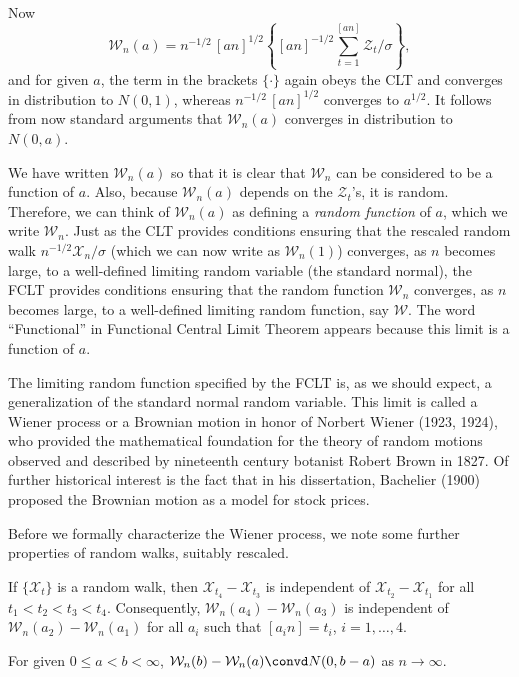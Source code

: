 Now
\[
\mathcal{W}_n(a) = n^{-1/2}\,[an]^{1/2}\left\{[an]^{-1/2}\sum_{t=1}^{[an]} \mathcal{Z}_t / \sigma\right\},
\]
and for given $a$, the term in the brackets $\{\cdot\}$ again obeys the CLT and converges in distribution to $N(0,1)$, whereas $n^{-1/2}\,[an]^{1/2}$ converges to $a^{1/2}$. It follows from now standard arguments that $\mathcal{W}_n(a)$ converges in distribution to $N(0,a)$.

We have written $\mathcal{W}_n(a)$ so that it is clear that $\mathcal{W}_n$ can be considered to be a function of $a$. Also, because $\mathcal{W}_n(a)$ depends on the $\mathcal{Z}_t$'s, it is random. Therefore, we can think of $\mathcal{W}_n(a)$ as defining a \emph{random function} of $a$, which we write $\mathcal{W}_n$. Just as the CLT provides conditions ensuring that the rescaled random walk $n^{-1/2}\mathcal{X}_n/\sigma$ (which we can now write as $\mathcal{W}_n(1)$) converges, as $n$ becomes large, to a well-defined limiting random variable (the standard normal), the FCLT provides conditions ensuring that the random function $\mathcal{W}_n$ converges, as $n$ becomes large, to a well-defined limiting random function, say $\mathcal{W}$. The word ``Functional'' in Functional Central Limit Theorem appears because this limit is a function of $a$.

The limiting random function specified by the FCLT is, as we should expect, a generalization of the standard normal random variable. This limit is called a Wiener process or a Brownian motion in honor of Norbert Wiener (1923, 1924), who provided the mathematical foundation for the theory of random motions observed and described by nineteenth century botanist Robert Brown in 1827. Of further historical interest is the fact that in his dissertation, Bachelier (1900) proposed the Brownian motion as a model for stock prices.

Before we formally characterize the Wiener process, we note some further properties of random walks, suitably rescaled.

\begin{exercises}
\item\label{ex:7.3} If $\{\mathcal{X}_t\}$ is a random walk, then $\mathcal{X}_{t_4} - \mathcal{X}_{t_3}$ is independent of $\mathcal{X}_{t_2} - \mathcal{X}_{t_1}$ for all $t_1 < t_2 < t_3 < t_4$. Consequently, $\mathcal{W}_n(a_4) - \mathcal{W}_n(a_3)$ is independent of $\mathcal{W}_n(a_2) - \mathcal{W}_n(a_1)$ for all $a_i$ such that $[a_i n] = t_i$, $i = 1, \ldots, 4$.

\item\label{ex:7.4} For given $0 \leq a < b < \infty$, $\mathcal{W}_n(b) - \mathcal{W}_n(a) \convd N(0, b-a)$ as $n \to \infty$.
\end{exercises}

